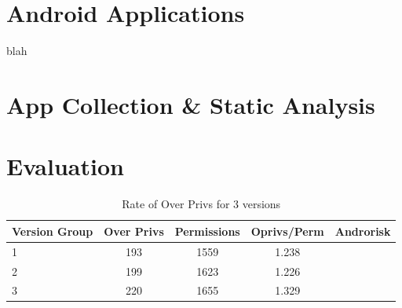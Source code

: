 \documentclass{sig-alternate}
\begin{document}










\label{sec: androidapplications}
\section{Android Applications}
%

blah

\label{sec: appcollection}
\section{App Collection \& Static Analysis}
%



\section{Evaluation}
\label{sec: evaluation}







\begin{table}[h]
\begin{center}
\caption{Rate of Over Privs for 3 versions}
\label{Table:TotalStatsForVersionGroups}
  \begin{tabular}{| l | c | c | c | c |} \hline

        \bfseries Version Group &	\bfseries Over Privs &	\bfseries Permissions & \bfseries Oprivs/Perm & \bfseries Androrisk \\ \hline
        1 & 193 & 1559 & 1.238 &  \\ \hline
        2 & 199 & 1623 & 1.226 & \\ \hline
        3 & 220 & 1655 & 1.329 & \\ \hline

  \end{tabular}
  \end{center}
\end{table}
\end{document}
